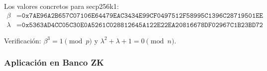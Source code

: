 \documentclass[11pt,a4paper,twoside,openright]{book}
\theoremstyle{definition}
\theoremstyle{plain}
\theoremstyle{remark}
\begin{document}
\begin{mathnote}
Los valores concretos para secp256k1:
\begin{align}
\beta &= \texttt{0x7AE96A2B657C07106E64479EAC3434E99CF0497512F58995C1396C28719501EE} \\
\lambda &= \texttt{0x5363AD4CC05C30E0A5261C028812645A122E22EA20816678DF02967C1B23BD72}
\end{align}

Verificación: $\beta^3 = 1 \pmod{p}$ y $\lambda^2 + \lambda + 1 = 0 \pmod{n}$.
\end{mathnote}

\subsubsection{Aplicación en Banco ZK}
\end{document}
